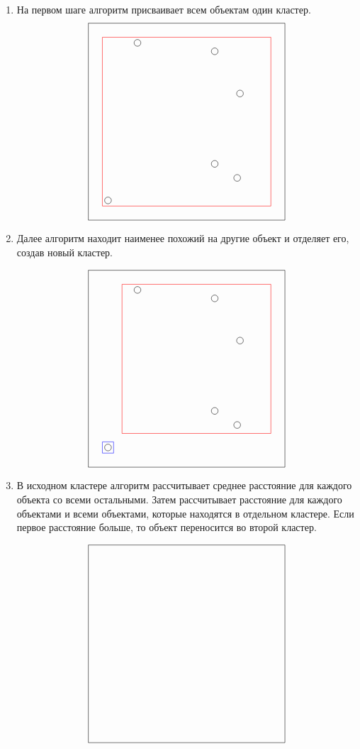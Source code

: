\documentclass[12pt, a4paper]{article}
\begin{document}
\begin{enumerate}
\item На первом шаге алгоритм присваивает всем объектам один кластер.
\[
\begin{tikzpicture}
        \draw (-3.5, 3.5) -- (3.5, 3.5);
        \draw (-3.5, -3.5) -- (3.5, -3.5);
        \draw (-3.5, -3.5) -- (-3.5, 3.5);
        \draw (3.5, 3.5) -- (3.5, -3.5);
        
        \draw (-2.8, -2.8) circle (0.12);
        \draw (-1.75, 2.8) circle (0.12);
        \draw (1, 2.5) circle (0.12);
        \draw (1.9, 1) circle (0.12);
        \draw (1, -1.5) circle (0.12);
        \draw (1.8, -2) circle (0.12);

        \draw[red] (-3, -3) rectangle (3, 3);
\end{tikzpicture}
\]

\item Далее алгоритм находит наименее похожий на другие объект и отделяет его, создав новый кластер. 

\[
\begin{tikzpicture}

        \begin{scope}
        \draw (-3.5, 3.5) -- (3.5, 3.5);
        \draw (-3.5, -3.5) -- (3.5, -3.5);
        \draw (-3.5, -3.5) -- (-3.5, 3.5);
        \draw (3.5, 3.5) -- (3.5, -3.5);

        \draw (-2.8, -2.8) circle (0.12);
        \draw (-1.75, 2.8) circle (0.12);
        \draw (1, 2.5) circle (0.12);
        \draw (1.9, 1) circle (0.12);
        \draw (1, -1.5) circle (0.12);
        \draw (1.8, -2) circle (0.12);

        
        \draw[red] (-2.3, -2.3) rectangle (3, 3);
        \draw[blue] (-3, -3) rectangle (-2.6, -2.6);
    \end{scope}
\end{tikzpicture}
\]

\item В исходном кластере алгоритм рассчитывает среднее расстояние для каждого объекта со всеми остальными. Затем рассчитывает расстояние для каждого объектами и всеми объектами, которые находятся в  отдельном кластере. Если первое расстояние больше, то объект переносится во второй кластер. 

\[
\begin{tikzpicture}
        \begin{scope}[yshift=-9cm]
        \draw (-3.5, 3.5) -- (3.5, 3.5);
        \draw (-3.5, -3.5) -- (3.5, -3.5);
        \draw (-3.5, -3.5) -- (-3.5, 3.5);
        \draw (3.5, 3.5) -- (3.5, -3.5);


\end{scope}
\end{tikzpicture}\]
\end{enumerate}
\end{document}
